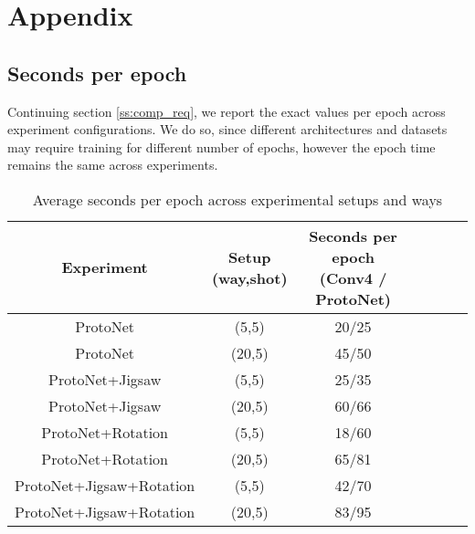 \newpage

\section{Appendix}

\subsection{Seconds per epoch}

Continuing section \ref{ss:comp_req}, we report the exact values per epoch across experiment configurations. We do so, since different architectures and datasets may require training for different number of epochs, however the epoch time remains the same across experiments.

\begin{table*}[hbt!]
\begin{center}
\begin{tabular}{|c|c|c|c|c|c|c|}
\hline
\textbf{Experiment}      & \textbf{Setup (way,shot)} & \textbf{Seconds per epoch (Conv4 / ProtoNet)}   \\
\hline\hline

ProtoNet                 & (5,5)          &          20/25                                 \\\hline

ProtoNet                 & (20,5)         &           45/50                               \\\hline
ProtoNet+Jigsaw          & (5,5)          &            25/35                             \\\hline
ProtoNet+Jigsaw          & (20,5)         &             60/66                               \\\hline
ProtoNet+Rotation        & (5,5)          &              18/60                             \\\hline
ProtoNet+Rotation        & (20,5)         &             65/81                            \\\hline
ProtoNet+Jigsaw+Rotation & (5,5)          &              42/70                            \\\hline
ProtoNet+Jigsaw+Rotation & (20,5)         &              83/95  \\
\hline
\end{tabular}
\end{center}
\caption{Average seconds per epoch across experimental setups and ways}
\label{table:epoch_time}
\end{table*}

